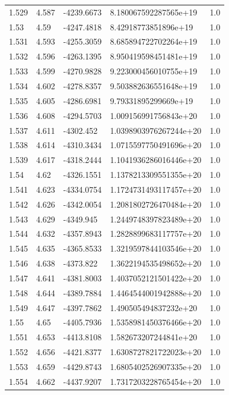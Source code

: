 \begin{tabular}{lllll}
1.529 & 4.587 & -4239.6673 & 8.180067592287565e+19 & 1.0 \\
1.53 & 4.59 & -4247.4818 & 8.42918773851896e+19 & 1.0 \\
1.531 & 4.593 & -4255.3059 & 8.685894722702264e+19 & 1.0 \\
1.532 & 4.596 & -4263.1395 & 8.950419598451481e+19 & 1.0 \\
1.533 & 4.599 & -4270.9828 & 9.223000456010755e+19 & 1.0 \\
1.534 & 4.602 & -4278.8357 & 9.503882636551648e+19 & 1.0 \\
1.535 & 4.605 & -4286.6981 & 9.79331895299669e+19 & 1.0 \\
1.536 & 4.608 & -4294.5703 & 1.009156991756843e+20 & 1.0 \\
1.537 & 4.611 & -4302.452 & 1.0398903976267244e+20 & 1.0 \\
1.538 & 4.614 & -4310.3434 & 1.0715597750491696e+20 & 1.0 \\
1.539 & 4.617 & -4318.2444 & 1.1041936286016446e+20 & 1.0 \\
1.54 & 4.62 & -4326.1551 & 1.1378213309551355e+20 & 1.0 \\
1.541 & 4.623 & -4334.0754 & 1.1724731493117457e+20 & 1.0 \\
1.542 & 4.626 & -4342.0054 & 1.2081802726470484e+20 & 1.0 \\
1.543 & 4.629 & -4349.945 & 1.2449748397823489e+20 & 1.0 \\
1.544 & 4.632 & -4357.8943 & 1.2828899683117757e+20 & 1.0 \\
1.545 & 4.635 & -4365.8533 & 1.3219597844103546e+20 & 1.0 \\
1.546 & 4.638 & -4373.822 & 1.3622194535498652e+20 & 1.0 \\
1.547 & 4.641 & -4381.8003 & 1.4037052121501422e+20 & 1.0 \\
1.548 & 4.644 & -4389.7884 & 1.4464544001942888e+20 & 1.0 \\
1.549 & 4.647 & -4397.7862 & 1.490505494837232e+20 & 1.0 \\
1.55 & 4.65 & -4405.7936 & 1.5358981450376466e+20 & 1.0 \\
1.551 & 4.653 & -4413.8108 & 1.582673207244841e+20 & 1.0 \\
1.552 & 4.656 & -4421.8377 & 1.6308727821722023e+20 & 1.0 \\
1.553 & 4.659 & -4429.8743 & 1.6805402526907335e+20 & 1.0 \\
1.554 & 4.662 & -4437.9207 & 1.7317203228765454e+20 & 1.0 \\

\end{tabular}

